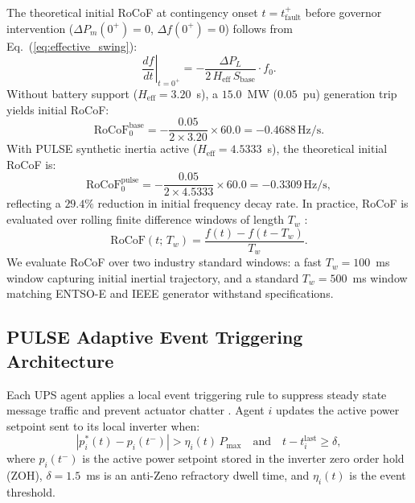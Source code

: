 \documentclass[preprint,12pt]{elsarticle}
\begin{document}
The theoretical initial RoCoF at contingency onset $t = t_{\mathrm{fault}}^+$ before governor intervention ($\Delta P_m(0^+) = 0$, $\Delta f(0^+) = 0$) follows from Eq.~(\ref{eq:effective_swing}):
\begin{equation}
\left.\frac{df}{dt}\right|_{t=0^+} = -\frac{\Delta P_L}{2\,H_{\mathrm{eff}}\,S_{\mathrm{base}}} \cdot f_0.
\label{eq:rocof_theoretical}
\end{equation}
Without battery support ($H_{\mathrm{eff}} = 3.20$~s), a $15.0$~MW ($0.05$~pu) generation trip yields initial RoCoF:
\begin{equation}
\mathrm{RoCoF}_0^{\mathrm{base}} = -\frac{0.05}{2 \times 3.20} \times 60.0 = -0.4688\,\mathrm{Hz/s}.
\label{eq:rocof_base_calc}
\end{equation}
With PULSE synthetic inertia active ($H_{\mathrm{eff}} = 4.5333$~s), the theoretical initial RoCoF is:
\begin{equation}
\mathrm{RoCoF}_0^{\mathrm{pulse}} = -\frac{0.05}{2 \times 4.5333} \times 60.0 = -0.3309\,\mathrm{Hz/s},
\label{eq:rocof_pulse_calc}
\end{equation}
reflecting a $29.4\%$ reduction in initial frequency decay rate. In practice, RoCoF is evaluated over rolling finite difference windows of length $T_w$ \cite{dulal2026inertia}:
\begin{equation}
\mathrm{RoCoF}(t;\, T_w) = \frac{f(t) - f(t - T_w)}{T_w}.
\label{eq:rocof_window}
\end{equation}
We evaluate RoCoF over two industry standard windows: a fast $T_w = 100$~ms window capturing initial inertial trajectory, and a standard $T_w = 500$~ms window matching ENTSO-E and IEEE generator withstand specifications.

\subsection{PULSE Adaptive Event Triggering Architecture}
\label{sec:thresholds}

Each UPS agent applies a local event triggering rule to suppress steady state message traffic and prevent actuator chatter \cite{tabuada2007,dimarogonas2012}. Agent $i$ updates the active power setpoint sent to its local inverter when:
\begin{equation}
\left|p_i^\ast(t) - p_i(t^-)\right| > \eta_i(t)\,P_{\max} \quad \text{and} \quad t - t_i^{\mathrm{last}} \ge \delta,
\label{eq:trigger}
\end{equation}
where $p_i(t^-)$ is the active power setpoint stored in the inverter zero order hold (ZOH), $\delta = 1.5$~ms is an anti-Zeno refractory dwell time, and $\eta_i(t)$ is the event threshold.
\end{document}
